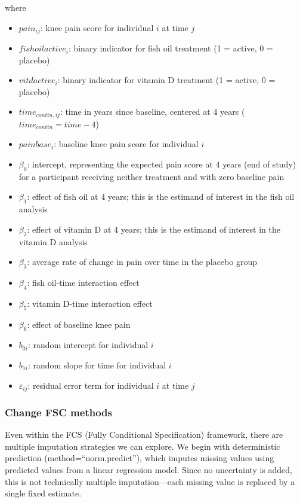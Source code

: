 \documentclass{article}
\providecommand{\tightlist}{%
  \setlength{\itemsep}{0pt}\setlength{\parskip}{0pt}}
\begin{document}
where

\begin{itemize}
\tightlist
\item
  \(pain_{ij}\): knee pain score for individual \(i\) at time \(j\)
\item
  \(fishoilactive_i\): binary indicator for fish oil treatment (1 =
  active, 0 = placebo)
\item
  \(vitdactive_i\): binary indicator for vitamin D treatment (1 =
  active, 0 = placebo)
\item
  \(time_{contin,ij}\): time in years since baseline, centered at 4
  years (\(time_{contin} = time - 4\))
\item
  \(painbase_i\): baseline knee pain score for individual \(i\)
\item
  \(\beta_0\): intercept, representing the expected pain score at 4
  years (end of study) for a participant receiving neither treatment and
  with zero baseline pain
\item
  \(\beta_1\): effect of fish oil at 4 years; this is the estimand of
  interest in the fish oil analysis
\item
  \(\beta_2\): effect of vitamin D at 4 years; this is the estimand of
  interest in the vitamin D analysis
\item
  \(\beta_3\): average rate of change in pain over time in the placebo
  group
\item
  \(\beta_4\): fish oil-time interaction effect
\item
  \(\beta_5\): vitamin D-time interaction effect
\item
  \(\beta_6\): effect of baseline knee pain
\item
  \(b_{0i}\): random intercept for individual \(i\)
\item
  \(b_{1i}\): random slope for time for individual \(i\)
\item
  \(\varepsilon_{ij}\): residual error term for individual \(i\) at time
  \(j\)
\end{itemize}

\subsubsection{Change FSC methods}\label{change-fsc-methods}

Even within the FCS (Fully Conditional Specification) framework, there
are multiple imputation strategies we can explore. We begin with
deterministic prediction (method=``norm.predict''), which imputes
missing values using predicted values from a linear regression model.
Since no uncertainty is added, this is not technically multiple
imputation---each missing value is replaced by a single fixed estimate.
\end{document}
